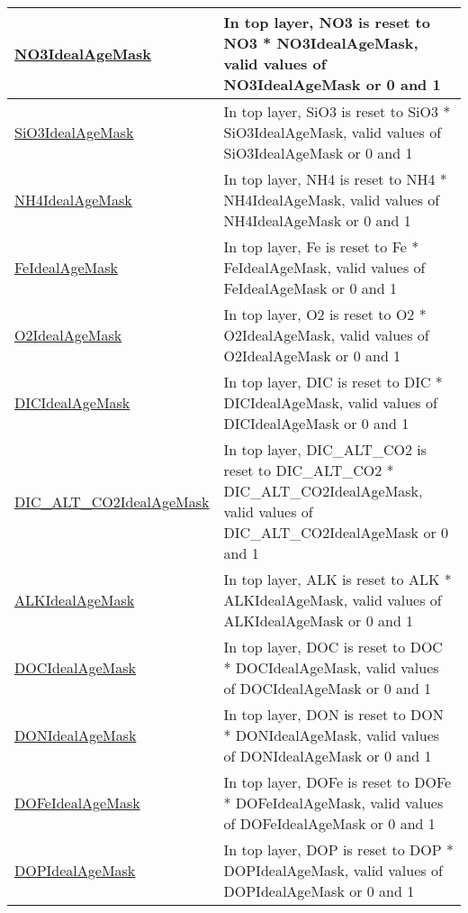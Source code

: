 {\begin{center}
\begin{longtable}{| p{2.0in} | p{4.0in} |}
    \hyperref[subsec:var_sec_forcing_NO3IdealAgeMask]{NO3IdealAgeMask} & In top layer, NO3 is reset to NO3 * NO3IdealAgeMask, valid values of NO3IdealAgeMask or 0 and 1 \\
    \hline
    \hyperref[subsec:var_sec_forcing_SiO3IdealAgeMask]{SiO3IdealAgeMask} & In top layer, SiO3 is reset to SiO3 * SiO3IdealAgeMask, valid values of SiO3IdealAgeMask or 0 and 1 \\
    \hline
    \hyperref[subsec:var_sec_forcing_NH4IdealAgeMask]{NH4IdealAgeMask} & In top layer, NH4 is reset to NH4 * NH4IdealAgeMask, valid values of NH4IdealAgeMask or 0 and 1 \\
    \hline
    \hyperref[subsec:var_sec_forcing_FeIdealAgeMask]{FeIdealAgeMask} & In top layer, Fe is reset to Fe * FeIdealAgeMask, valid values of FeIdealAgeMask or 0 and 1 \\
    \hline
    \hyperref[subsec:var_sec_forcing_O2IdealAgeMask]{O2IdealAgeMask} & In top layer, O2 is reset to O2 * O2IdealAgeMask, valid values of O2IdealAgeMask or 0 and 1 \\
    \hline
    \hyperref[subsec:var_sec_forcing_DICIdealAgeMask]{DICIdealAgeMask} & In top layer, DIC is reset to DIC * DICIdealAgeMask, valid values of DICIdealAgeMask or 0 and 1 \\
    \hline
    \hyperref[subsec:var_sec_forcing_DIC_ALT_CO2IdealAgeMask]{DIC\_ALT\_CO2IdealAgeMask} & In top layer, DIC\_ALT\_CO2 is reset to DIC\_ALT\_CO2 * DIC\_ALT\_CO2IdealAgeMask, valid values of DIC\_ALT\_CO2IdealAgeMask or 0 and 1 \\
    \hline
    \hyperref[subsec:var_sec_forcing_ALKIdealAgeMask]{ALKIdealAgeMask} & In top layer, ALK is reset to ALK * ALKIdealAgeMask, valid values of ALKIdealAgeMask or 0 and 1 \\
    \hline
    \hyperref[subsec:var_sec_forcing_DOCIdealAgeMask]{DOCIdealAgeMask} & In top layer, DOC is reset to DOC * DOCIdealAgeMask, valid values of DOCIdealAgeMask or 0 and 1 \\
    \hline
    \hyperref[subsec:var_sec_forcing_DONIdealAgeMask]{DONIdealAgeMask} & In top layer, DON is reset to DON * DONIdealAgeMask, valid values of DONIdealAgeMask or 0 and 1 \\
    \hline
    \hyperref[subsec:var_sec_forcing_DOFeIdealAgeMask]{DOFeIdealAgeMask} & In top layer, DOFe is reset to DOFe * DOFeIdealAgeMask, valid values of DOFeIdealAgeMask or 0 and 1 \\
    \hline
    \hyperref[subsec:var_sec_forcing_DOPIdealAgeMask]{DOPIdealAgeMask} & In top layer, DOP is reset to DOP * DOPIdealAgeMask, valid values of DOPIdealAgeMask or 0 and 1 \\

\end{longtable}
\end{center}}

